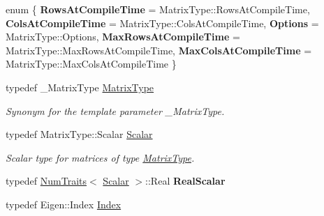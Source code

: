\begin{DoxyCompactItemize}
\item 
\mbox{\label{class_eigen_1_1_complex_eigen_solver_a198572d21c4e4f0119f14a744c381e37}} 
enum \{ \newline
{\bfseries Rows\+At\+Compile\+Time} = Matrix\+Type\+::Rows\+At\+Compile\+Time, 
{\bfseries Cols\+At\+Compile\+Time} = Matrix\+Type\+::Cols\+At\+Compile\+Time, 
{\bfseries Options} = Matrix\+Type\+::Options, 
{\bfseries Max\+Rows\+At\+Compile\+Time} = Matrix\+Type\+::Max\+Rows\+At\+Compile\+Time, 
\newline
{\bfseries Max\+Cols\+At\+Compile\+Time} = Matrix\+Type\+::Max\+Cols\+At\+Compile\+Time
 \}
\item 
\mbox{\label{class_eigen_1_1_complex_eigen_solver_ad61f6278843a601096276c9a72c0252f}} 
typedef \+\_\+\+Matrix\+Type \mbox{\hyperlink{class_eigen_1_1_complex_eigen_solver_ad61f6278843a601096276c9a72c0252f}{Matrix\+Type}}
\begin{DoxyCompactList}\small\item\em Synonym for the template parameter {\ttfamily \+\_\+\+Matrix\+Type}. \end{DoxyCompactList}\item 
\mbox{\label{class_eigen_1_1_complex_eigen_solver_a61035d40c9498bb1d47628cdd4946785}} 
typedef Matrix\+Type\+::\+Scalar \mbox{\hyperlink{class_eigen_1_1_complex_eigen_solver_a61035d40c9498bb1d47628cdd4946785}{Scalar}}
\begin{DoxyCompactList}\small\item\em Scalar type for matrices of type \mbox{\hyperlink{class_eigen_1_1_complex_eigen_solver_ad61f6278843a601096276c9a72c0252f}{Matrix\+Type}}. \end{DoxyCompactList}\item 
\mbox{\label{class_eigen_1_1_complex_eigen_solver_a7c2f4ce02837e653f92d40a3f3acad87}} 
typedef \mbox{\hyperlink{struct_eigen_1_1_num_traits}{Num\+Traits}}$<$ \mbox{\hyperlink{class_eigen_1_1_complex_eigen_solver_a61035d40c9498bb1d47628cdd4946785}{Scalar}} $>$\+::Real {\bfseries Real\+Scalar}
\item 
typedef Eigen\+::\+Index \mbox{\hyperlink{class_eigen_1_1_complex_eigen_solver_abc0218d8b902af0d6c759bfc0a8a8d74}{Index}}

\end{DoxyCompactItemize}
